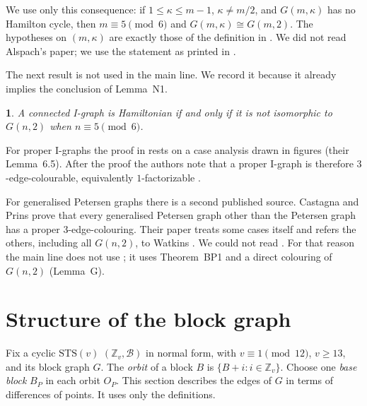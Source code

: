 \documentclass[11pt]{amsart}
\theoremstyle{plain}
\newcommand{\citedname}{}
\newtheorem*{citedinner}{\citedname}
\newenvironment{cited}[1]{\renewcommand{\citedname}{#1}\begin{citedinner}}{\end{citedinner}}
\theoremstyle{definition}
\theoremstyle{remark}
\numberwithin{equation}{section}
\newcommand{\Z}{\mathbb{Z}}
\newcommand{\cB}{\mathcal{B}}
\newcommand{\STS}{\mathrm{STS}}
\begin{document}
We use only this consequence: if \(1\le\kappa\le m-1\), \(\kappa\ne m/2\), and \(G(m,\kappa)\) has no Hamilton cycle, then \(m\equiv5\pmod6\) and \(G(m,\kappa)\cong G(m,2)\). The hypotheses on \((m,\kappa)\) are exactly those of the definition in \cite{BP}. We did not read Alspach's paper; we use the statement as printed in \cite{BP}.

The next result is not used in the main line. We record it because it already implies the conclusion of Lemma~N1.

\begin{cited}{Theorem BP2 (\cite[Theorem~1.2]{BP})}
A connected I-graph is Hamiltonian if and only if it is not isomorphic to \(G(n,2)\) when \(n\equiv 5\pmod 6\).
\end{cited}

For proper I-graphs the proof in \cite{BP} rests on a case analysis drawn in figures (their Lemma~6.5). After the proof the authors note that a proper I-graph is therefore \(3\)-edge-colourable, equivalently \(1\)-factorizable \cite[\S7, p.~20]{BP}.

For generalised Petersen graphs there is a second published source. Castagna and Prins \cite{CP} prove that every generalised Petersen graph other than the Petersen graph has a proper \(3\)-edge-colouring. Their paper treats some cases itself and refers the others, including all \(G(n,2)\), to Watkins \cite{Wat}. We could not read \cite{Wat}. For that reason the main line does not use \cite{CP}; it uses Theorem~BP1 and a direct colouring of \(G(n,2)\) (Lemma~G).

\section{Structure of the block graph}\label{sec:structure}

Fix a cyclic \(\STS(v)\) \((\Z_v,\cB)\) in normal form, with \(v\equiv1\pmod{12}\), \(v\ge13\), and its block graph \(G\). The \emph{orbit} of a block \(B\) is \(\{B+i : i\in\Z_v\}\). Choose one \emph{base block} \(B_P\) in each orbit \(O_P\). This section describes the edges of \(G\) in terms of differences of points. It uses only the definitions.
\end{document}
